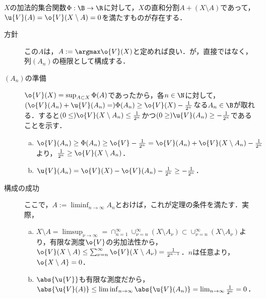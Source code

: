 \documentclass[uplatex, dvipdfmx]{jsreport}
\begin{document}
\begin{theorem}\label{thm-Hahn-decomposition-theorem}
    $X$の加法的集合関数$\Phi:\B\to\R$に対して，$X$の直和分割$A+(X\setminus A)$であって，$\u{V}(A)=\o{V}(X\setminus A)=0$を満たすものが存在する．
\end{theorem}
\begin{Proof}\mbox{}
    \begin{description}
        \item[方針] この$A$は，$A:=\argmax\o{V}(X)$と定めれば良い．が，直接ではなく，列$(A_n)$の極限として構成する．
        \item[$(A_n)$の準備] $\o{V}(X)=\sup_{A\subset X}\Phi(A)$であったから，各$n\in\N$に対して，$(\o{V}(A_n)+\u{V}(A_n)=)\Phi(A_n)\ge\o{V}(X)-\frac{1}{2^n}$なる$A_n\in\B$が取れる．すると$(0\le)\o{V}(X\setminus A_n)\le\frac{1}{2^n}$かつ$(0\ge)\u{V}(A_n)\ge-\frac{1}{2^n}$であることを示す．
        \begin{enumerate}[(a)]
            \item $\o{V}(A_n)\ge\Phi(A_n)\ge\o{V}-\frac{1}{2^n}=\o{V}(A_n)+\o{V}(X\setminus A_n)-\frac{1}{2^n}$より，$\frac{1}{2^n}\ge\o{V}(X\setminus A_n)$．
            \item $\u{V}(A_n)=\o{V}(X)-\o{V}(A_n)-\frac{1}{2^n}\ge-\frac{1}{2^n}$．
        \end{enumerate}
        \item[構成の成功] ここで，$A:=\liminf_{n\to\infty}A_n$とおけば，これが定理の条件を満たす．実際，
        \begin{enumerate}[(a)]
            \item $X\setminus A=\limsup_{\nu\to\infty}=\cap^\infty_{n=1}\cup_{\nu=n}^\infty (X\setminus A_\nu)\subset\cup^\infty_{\nu=n}(X\setminus A_\nu)$より，有限な測度$\o{V}$の劣加法性から，$\o{V}(X\setminus A)\le\sum^\infty_{\nu=n}\o{V}(X\setminus A_\nu)=\frac{1}{2^{n-1}}$．$n$は任意より，$\o{X\setminus A}=0$．
            \item $\abs{\u{V}}$も有限な測度だから，$\abs{\u{V}(A)}\le\liminf_{n\to\infty}\abs{\u{V}(A_n)}=\lim_{n\to\infty}\frac{1}{2^n}=0$．
        \end{enumerate}
    \end{description}
\end{Proof}
\end{document}
